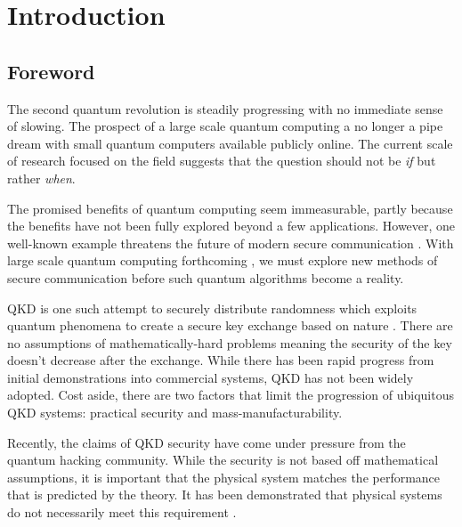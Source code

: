 %
%
\graphicspath{{./chapters/chapter01/fig01/}}

\let\textcircled=\pgftextcircled
\chapter{Introduction}
\label{chap:intro}

\section{Foreword}

The second quantum revolution is steadily progressing with no immediate sense of slowing. The prospect of a large scale quantum computing a no longer a pipe dream with small quantum computers available publicly online. The current scale of research focused on the field suggests that the question should not be \emph{if} but rather \emph{when}. 

The promised benefits of quantum computing seem immeasurable, partly because the benefits have not been fully explored beyond a few applications. However, one well-known example threatens the future of modern secure communication \cite{shor1994}. With large scale quantum computing forthcoming \cite{arute2019quantum}, we must explore new methods of secure communication before such quantum algorithms become a reality.


 \Ac{QKD} is one such attempt to securely distribute randomness which exploits quantum phenomena to create a secure key exchange based on nature \cite{BB84, E91}. There are no assumptions of mathematically-hard problems meaning the security of the key doesn't decrease after the exchange. While there has been rapid progress from initial demonstrations into commercial systems, \ac{QKD} has not been widely adopted. Cost aside, there are two factors that limit the progression of ubiquitous \ac{QKD} systems: practical security and mass-manufacturability. 

Recently, the claims of \ac{QKD} security have come under pressure from the quantum hacking community. While the security is not based off mathematical assumptions, it is important that the physical system matches the performance that is predicted by the theory. It has been demonstrated that physical systems do not necessarily meet this requirement \cite{xu2019quantum}.

